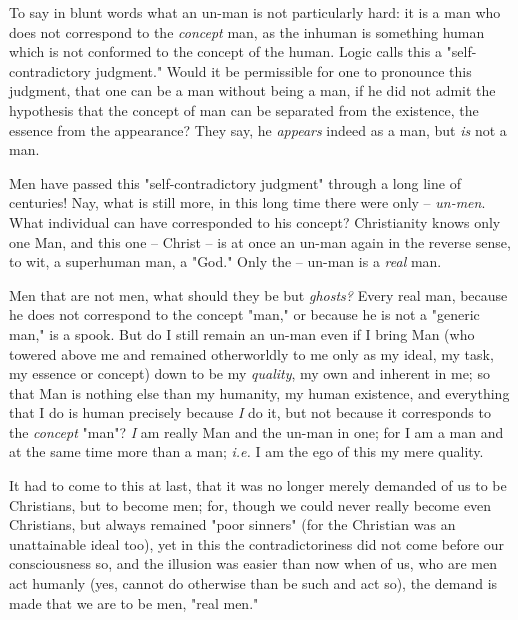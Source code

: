\documentclass[a4paper]{book}
\begin{document}
To say in blunt words what an un-man is not particularly hard: it is a man who 
does not correspond to the \textit{concept} man, as the inhuman is something 
human which is not conformed to the concept of the human. Logic calls this a 
"{}self-contradictory judgment."{} Would it be permissible for one to 
pronounce this judgment, that one can be a man without being a man, if he did 
not admit the hypothesis that the concept of man can be separated from the 
existence, the essence from the appearance? They say, he \textit{appears} 
indeed as a man, but \textit{is} not a man.

Men have passed this "{}self-contradictory judgment"{} through a long line of 
centuries! Nay, what is still more, in this long time there were only -- 
\textit{un-men}. What individual can have corresponded to his concept? 
Christianity knows only one Man, and this one -- Christ -- is at once an 
un-man again in the reverse sense, to wit, a superhuman man, a "{}God."{} Only 
the -- un-man is a \textit{real} man.

Men that are not men, what should they be but \textit{ghosts?} Every real man, 
because he does not correspond to the concept "{}man,"{} or because he is not 
a "{}generic man,"{} is a spook. But do I still remain an un-man even if I 
bring Man (who towered above me and remained otherworldly to me only as my 
ideal, my task, my essence or concept) down to be my \textit{quality}, my own 
and inherent in me; so that Man is nothing else than my humanity, my human 
existence, and everything that I do is human precisely because \textit{I} do 
it, but not because it corresponds to the \textit{concept} "{}man"{}? 
\textit{I} am really Man and the un-man in one; for I am a man and at the same 
time more than a man; \textit{i.e.} I am the ego of this my mere quality.

It had to come to this at last, that it was no longer merely demanded of us to 
be Christians, but to become men; for, though we could never really become 
even Christians, but always remained "{}poor sinners"{} (for the Christian was 
an unattainable ideal too), yet in this the contradictoriness did not come 
before our consciousness so, and the illusion was easier than now when of us, 
who are men act humanly (yes, cannot do otherwise than be such and act so), 
the demand is made that we are to be men, "{}real men."{}
\end{document}
